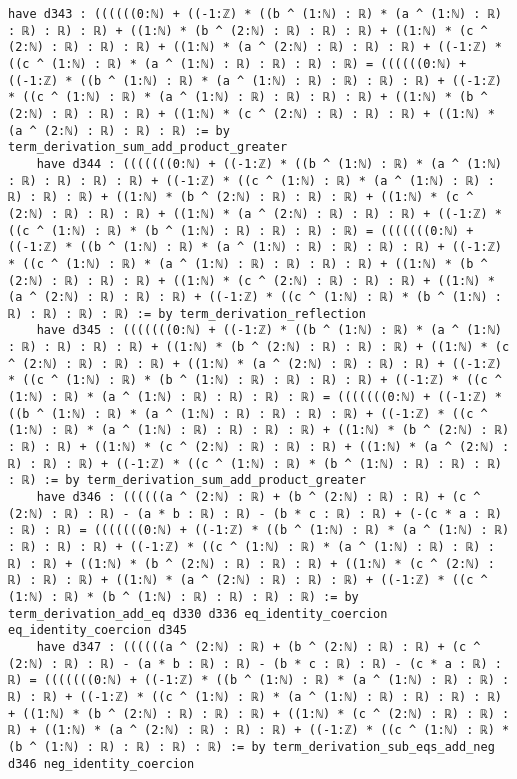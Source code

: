 \documentclass{article}
\begin{document}
\begin{tcolorbox}[colback=white!10, width=\linewidth]
\begin{lstlisting}[language=Lean4]
    have d343 : ((((((0:ℕ) + ((-1:ℤ) * ((b ^ (1:ℕ) : ℝ) * (a ^ (1:ℕ) : ℝ) : ℝ) : ℝ) : ℝ) + ((1:ℕ) * (b ^ (2:ℕ) : ℝ) : ℝ) : ℝ) + ((1:ℕ) * (c ^ (2:ℕ) : ℝ) : ℝ) : ℝ) + ((1:ℕ) * (a ^ (2:ℕ) : ℝ) : ℝ) : ℝ) + ((-1:ℤ) * ((c ^ (1:ℕ) : ℝ) * (a ^ (1:ℕ) : ℝ) : ℝ) : ℝ) : ℝ) = ((((((0:ℕ) + ((-1:ℤ) * ((b ^ (1:ℕ) : ℝ) * (a ^ (1:ℕ) : ℝ) : ℝ) : ℝ) : ℝ) + ((-1:ℤ) * ((c ^ (1:ℕ) : ℝ) * (a ^ (1:ℕ) : ℝ) : ℝ) : ℝ) : ℝ) + ((1:ℕ) * (b ^ (2:ℕ) : ℝ) : ℝ) : ℝ) + ((1:ℕ) * (c ^ (2:ℕ) : ℝ) : ℝ) : ℝ) + ((1:ℕ) * (a ^ (2:ℕ) : ℝ) : ℝ) : ℝ) := by term_derivation_sum_add_product_greater
    have d344 : (((((((0:ℕ) + ((-1:ℤ) * ((b ^ (1:ℕ) : ℝ) * (a ^ (1:ℕ) : ℝ) : ℝ) : ℝ) : ℝ) + ((-1:ℤ) * ((c ^ (1:ℕ) : ℝ) * (a ^ (1:ℕ) : ℝ) : ℝ) : ℝ) : ℝ) + ((1:ℕ) * (b ^ (2:ℕ) : ℝ) : ℝ) : ℝ) + ((1:ℕ) * (c ^ (2:ℕ) : ℝ) : ℝ) : ℝ) + ((1:ℕ) * (a ^ (2:ℕ) : ℝ) : ℝ) : ℝ) + ((-1:ℤ) * ((c ^ (1:ℕ) : ℝ) * (b ^ (1:ℕ) : ℝ) : ℝ) : ℝ) : ℝ) = (((((((0:ℕ) + ((-1:ℤ) * ((b ^ (1:ℕ) : ℝ) * (a ^ (1:ℕ) : ℝ) : ℝ) : ℝ) : ℝ) + ((-1:ℤ) * ((c ^ (1:ℕ) : ℝ) * (a ^ (1:ℕ) : ℝ) : ℝ) : ℝ) : ℝ) + ((1:ℕ) * (b ^ (2:ℕ) : ℝ) : ℝ) : ℝ) + ((1:ℕ) * (c ^ (2:ℕ) : ℝ) : ℝ) : ℝ) + ((1:ℕ) * (a ^ (2:ℕ) : ℝ) : ℝ) : ℝ) + ((-1:ℤ) * ((c ^ (1:ℕ) : ℝ) * (b ^ (1:ℕ) : ℝ) : ℝ) : ℝ) : ℝ) := by term_derivation_reflection
    have d345 : (((((((0:ℕ) + ((-1:ℤ) * ((b ^ (1:ℕ) : ℝ) * (a ^ (1:ℕ) : ℝ) : ℝ) : ℝ) : ℝ) + ((1:ℕ) * (b ^ (2:ℕ) : ℝ) : ℝ) : ℝ) + ((1:ℕ) * (c ^ (2:ℕ) : ℝ) : ℝ) : ℝ) + ((1:ℕ) * (a ^ (2:ℕ) : ℝ) : ℝ) : ℝ) + ((-1:ℤ) * ((c ^ (1:ℕ) : ℝ) * (b ^ (1:ℕ) : ℝ) : ℝ) : ℝ) : ℝ) + ((-1:ℤ) * ((c ^ (1:ℕ) : ℝ) * (a ^ (1:ℕ) : ℝ) : ℝ) : ℝ) : ℝ) = (((((((0:ℕ) + ((-1:ℤ) * ((b ^ (1:ℕ) : ℝ) * (a ^ (1:ℕ) : ℝ) : ℝ) : ℝ) : ℝ) + ((-1:ℤ) * ((c ^ (1:ℕ) : ℝ) * (a ^ (1:ℕ) : ℝ) : ℝ) : ℝ) : ℝ) + ((1:ℕ) * (b ^ (2:ℕ) : ℝ) : ℝ) : ℝ) + ((1:ℕ) * (c ^ (2:ℕ) : ℝ) : ℝ) : ℝ) + ((1:ℕ) * (a ^ (2:ℕ) : ℝ) : ℝ) : ℝ) + ((-1:ℤ) * ((c ^ (1:ℕ) : ℝ) * (b ^ (1:ℕ) : ℝ) : ℝ) : ℝ) : ℝ) := by term_derivation_sum_add_product_greater
    have d346 : ((((((a ^ (2:ℕ) : ℝ) + (b ^ (2:ℕ) : ℝ) : ℝ) + (c ^ (2:ℕ) : ℝ) : ℝ) - (a * b : ℝ) : ℝ) - (b * c : ℝ) : ℝ) + (-(c * a : ℝ) : ℝ) : ℝ) = (((((((0:ℕ) + ((-1:ℤ) * ((b ^ (1:ℕ) : ℝ) * (a ^ (1:ℕ) : ℝ) : ℝ) : ℝ) : ℝ) + ((-1:ℤ) * ((c ^ (1:ℕ) : ℝ) * (a ^ (1:ℕ) : ℝ) : ℝ) : ℝ) : ℝ) + ((1:ℕ) * (b ^ (2:ℕ) : ℝ) : ℝ) : ℝ) + ((1:ℕ) * (c ^ (2:ℕ) : ℝ) : ℝ) : ℝ) + ((1:ℕ) * (a ^ (2:ℕ) : ℝ) : ℝ) : ℝ) + ((-1:ℤ) * ((c ^ (1:ℕ) : ℝ) * (b ^ (1:ℕ) : ℝ) : ℝ) : ℝ) : ℝ) := by term_derivation_add_eq d330 d336 eq_identity_coercion eq_identity_coercion d345
    have d347 : ((((((a ^ (2:ℕ) : ℝ) + (b ^ (2:ℕ) : ℝ) : ℝ) + (c ^ (2:ℕ) : ℝ) : ℝ) - (a * b : ℝ) : ℝ) - (b * c : ℝ) : ℝ) - (c * a : ℝ) : ℝ) = (((((((0:ℕ) + ((-1:ℤ) * ((b ^ (1:ℕ) : ℝ) * (a ^ (1:ℕ) : ℝ) : ℝ) : ℝ) : ℝ) + ((-1:ℤ) * ((c ^ (1:ℕ) : ℝ) * (a ^ (1:ℕ) : ℝ) : ℝ) : ℝ) : ℝ) + ((1:ℕ) * (b ^ (2:ℕ) : ℝ) : ℝ) : ℝ) + ((1:ℕ) * (c ^ (2:ℕ) : ℝ) : ℝ) : ℝ) + ((1:ℕ) * (a ^ (2:ℕ) : ℝ) : ℝ) : ℝ) + ((-1:ℤ) * ((c ^ (1:ℕ) : ℝ) * (b ^ (1:ℕ) : ℝ) : ℝ) : ℝ) : ℝ) := by term_derivation_sub_eqs_add_neg d346 neg_identity_coercion

\end{lstlisting}
\end{tcolorbox}
\end{document}
